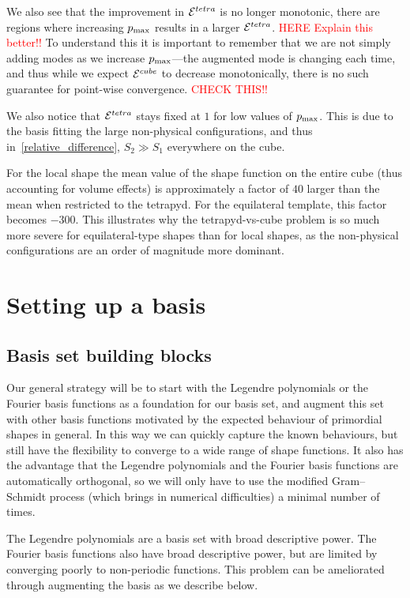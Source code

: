     We also see that the improvement in $\mathcal{E}^{tetra}$ is no longer
    monotonic, there are regions where increasing $p_\text{max}$ results in
    a larger $\mathcal{E}^{tetra}$. \textcolor{red}{HERE Explain this better!!}
    To understand this it is important to remember that we are not simply
    adding modes as we increase $p_\text{max}$---the augmented mode is changing
    each time, and thus while we expect $\mathcal{E}^{cube}$ to decrease monotonically,
    there is no such guarantee for point-wise convergence. \textcolor{red}{CHECK THIS!!}


    We also notice that $\mathcal{E}^{tetra}$ stays fixed at $1$ for low values of $p_\text{max}$.
    This is due to the basis fitting the large non-physical configurations,
    and thus in~\eqref{relative_difference}, $S_2 \gg S_1$ everywhere on the cube.

    For the local shape the mean value of the shape function on the entire cube
    (thus accounting for volume effects) is approximately a factor of $40$ larger than the mean
    when restricted to the tetrapyd. For the equilateral template, this factor becomes $-300$.
    This illustrates why the tetrapyd-vs-cube problem is so much more severe for equilateral-type
    shapes than for local shapes, as the non-physical configurations are an order of magnitude
    more dominant.
\section{Setting up a basis}
    \subsection{Basis set building blocks}
    Our general strategy will be to start with the Legendre polynomials
    or the Fourier basis functions as a foundation for our basis set,
    and augment this set with other basis functions motivated by the
    expected behaviour of primordial shapes in general.
    In this way we can quickly capture the known behaviours,
    but still have the flexibility to converge to a wide range
    of shape functions. It also has the advantage that the Legendre polynomials
    and the Fourier basis functions are automatically orthogonal,
    so we will only have to use the modified Gram–Schmidt process
    (which brings in numerical difficulties)
    a minimal number of times.


    The Legendre polynomials are a basis set with broad descriptive power.
    The Fourier basis functions also have broad descriptive power,
    but are limited by converging poorly to non-periodic functions.
    This problem can be ameliorated through augmenting the basis as we describe below.
